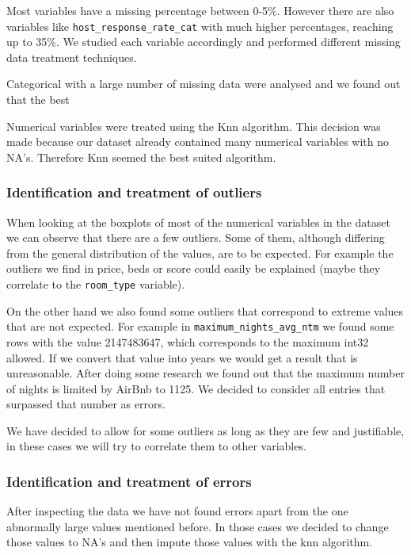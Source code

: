 Most variables have a missing percentage between 0-5\%. However there are also
variables like \texttt{host\_response\_rate\_cat} with much higher percentages,
reaching up to 35\%. We studied each variable accordingly and performed different missing data treatment techniques.

Categorical with a large number of missing data were analysed and we found out that the best 

Numerical variables were treated using the Knn algorithm. This decision was made because our dataset already contained many numerical variables with no NA's. Therefore Knn seemed the best suited algorithm.

\subsubsection{Identification and treatment of outliers}

When looking at the boxplots of most of the numerical variables in the dataset
we can observe that there are a few outliers. Some of them, although differing
from the general distribution of the values, are to be expected. For example the
outliers we find in price, beds or score could easily be explained (maybe they
correlate to the \texttt{room\_type} variable).

On the other hand we also found some outliers that correspond to extreme values
that are not expected. For example in \texttt{maximum\_nights\_avg\_ntm} we
found some rows with the value 2147483647, which corresponds to the maximum
int32 allowed. If we convert that value into years we would get a result that is
unreasonable. After doing some research we found out that the maximum number of nights is limited by AirBnb to 1125. We decided to consider all entries that surpassed that number as errors. 

We have decided to allow for some outliers as long as they are few and
justifiable, in these cases we will try to correlate them to other variables.

\subsubsection{Identification and treatment of errors}

After inspecting the data we have not found errors apart from the one abnormally
large values mentioned before. In those cases we decided to change those values to NA's and then impute those values with the knn algorithm.

